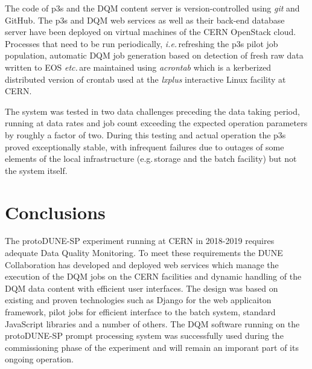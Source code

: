\documentclass{webofc}
\newcommand{\pd}{protoDUNE\xspace}
\begin{document}
The code of p3s and the DQM content server is version-controlled using \textit{git}
and GitHub. The p3s and DQM web services as well as their back-end database server have been deployed on
virtual machines of the CERN OpenStack cloud. Processes that need to be run periodically,
\textit{i.e.}\,refreshing the p3s pilot job population, automatic DQM job generation based on detection
of fresh raw data written to EOS \textit{etc.}\,are maintained using \textit{acrontab} which is a kerberized
distributed version of crontab used at the \textit{lxplus} interactive Linux facility at CERN.

The system was tested in two data challenges preceding the data taking period, running
at data rates and job count exceeding the expected operation parameters by roughly
a factor of two. During this testing and actual operation the p3s proved exceptionally stable,
with infrequent failures due to outages of some elements of the local infrastructure
(e.g.\,storage and the batch facility) but not the system itself.

\section{Conclusions}

The \pd-SP experiment running at CERN in 2018-2019 requires adequate Data
Quality Monitoring. To meet these requirements the DUNE Collaboration has developed
and deployed web services which manage the execution of the DQM jobs on the CERN
facilities and dynamic handling of the DQM data content with efficient user interfaces.
The design was based on existing and proven technologies such as Django
for the web applicaiton framework,  pilot jobs for efficient interface to
the batch system, standard  JavaScript libraries and a number of others. The DQM software
running on the \pd-SP prompt processing system was  successfully used during
the commissioning phase of the experiment and will remain an imporant part
of its ongoing operation.

%
% 
%
%
\end{document}
